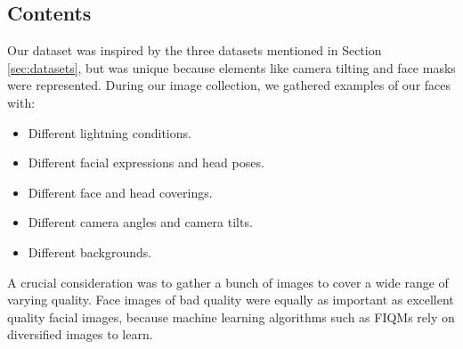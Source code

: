 \subsection*{Contents}
Our dataset was inspired by the three datasets mentioned in Section \ref{sec:datasets}, but was unique because elements like camera tilting and face masks were represented. During our image collection, we gathered examples of our faces with: 
%
\begin{itemize}
    \item Different lightning conditions.
    \item Different facial expressions and head poses.
    \item Different face and head coverings. 
    \item Different camera angles and camera tilts.
    \item Different backgrounds.
\end{itemize}
%
A crucial consideration was to gather a bunch of images to cover a wide range of varying quality. Face images of bad quality were equally as important as excellent quality facial images, because machine learning algorithms such as FIQMs rely on diversified images to learn.  

